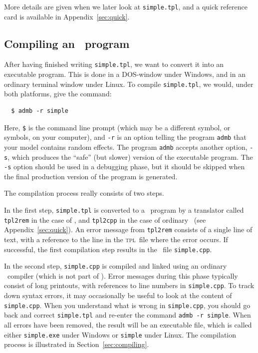 \documentclass{admbmanual}
\begin{document}
More details are given when we later look at \texttt{simple.tpl}, and a quick
reference card is available in Appendix~\ref{sec:quick}.

\subsection{Compiling an \scAB\ program}

After having finished writing \texttt{simple.tpl}, we want to convert it into an
executable program. This is done in a \textsc{DOS}-window under Windows, and in
an ordinary terminal window under Linux. To compile \texttt{simple.tpl}, we
would, under both platforms, give the command:
\begin{lstlisting}
  $ admb -r simple
\end{lstlisting}
Here, \texttt{\$} is the command line prompt (which may be a different symbol,
or symbols, on your computer), and \texttt{-r} is an option telling the program
\texttt{admb} that your model contains random effects. The program \texttt{admb}
accepts another option, \texttt{-s}, which produces the ``safe'' (but slower)
version of the executable program. The \texttt{-s} option should be used in a
debugging phase, but it should be skipped when the final production version of
the program is generated.

The compilation process really consists of two steps.

In the first step, \texttt{simple.tpl} is converted to a \cplus\ program by a
translator called \texttt{tpl2rem} in the case of \scAR, and \texttt{tpl2cpp}
in the case of ordinary \scAB\ (see Appendix~\ref{sec:quick}). An error message
from \texttt{tpl2rem} consists of a single line of text, with a reference to the
line in the \textsc{tpl}~file where the error occurs. If successful, the first
compilation step results in the \cplus\ file \texttt{simple.cpp}.

In the second step, \texttt{simple.cpp} is compiled and linked using an ordinary
\cplus\ compiler (which is not part of \scAB). Error messages during this phase
typically consist of long printouts, with references to line numbers in
\texttt{simple.cpp}. To track down syntax errors, it may occasionally be useful
to look at the content of \texttt{simple.cpp}. When you understand what is wrong
in \texttt{simple.cpp}, you should go back and correct \texttt{simple.tpl} and
re-enter the command \texttt{admb -r simple}. When all errors have been removed,
the result will be an executable file, which is called either
\texttt{simple.exe} under Windows or \texttt{simple} under Linux. The
compilation process is illustrated in Section~\ref{sec:compiling}.
\end{document}
